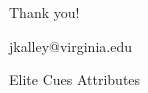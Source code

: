 \documentclass[12pt]{beamer}
\begin{document}



\begin{frame}[standout]

Thank you! 

jkalley@virginia.edu

\end{frame}


\appendix 



\begin{frame}{Elite Cues Attributes}


\end{frame}





\end{document}
